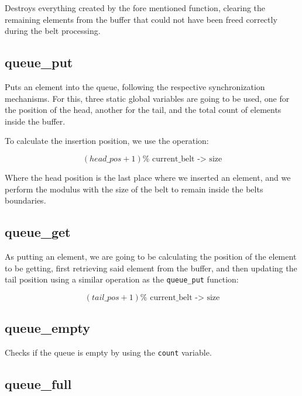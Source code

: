 \documentclass[es]{uc3mreport}
\begin{document}
\begin{report}
      Destroys everything created by the fore mentioned function,
      clearing the remaining elements from the buffer that could not
      have been freed correctly during the belt processing.

      \subsection{queue\_put}

      \setcounter{subsubsection}{0}

      Puts an element into the queue, following the respective
      synchronization mechanisms. For this, three static global
      variables are going to be used, one for the position of the head,
      another for the tail, and the total count of elements inside the
      buffer.

      To calculate the insertion position, we use the operation:

      \[(head\_pos + 1) \% \text{ current\_belt -> size}\]

      Where the head position is the last place where we inserted an
      element, and we perform the modulus with the size of the belt to
      remain inside the belts boundaries.

      \subsection{queue\_get}

      \setcounter{subsubsection}{0}

      As putting an element, we are going to be calculating the position
      of the element to be getting, first retrieving said element from
      the buffer, and then updating the tail position using a similar
      operation as the \texttt{queue\_put} function:

      \[(tail\_pos + 1) \% \text{ current\_belt -> size}\]

      \subsection{queue\_empty}

      \setcounter{subsubsection}{0}

      Checks if the queue is empty by using the \texttt{count} variable.

      \subsection{queue\_full}


\end{report}
\end{document}
